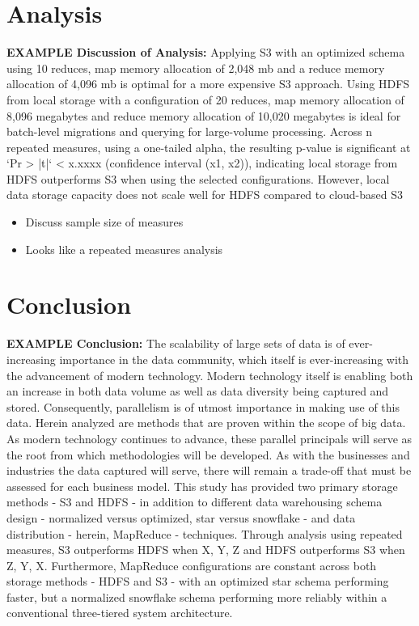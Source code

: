 \documentclass[journal]{IEEEtran}
\begin{document}
\section{Analysis}

\textbf{EXAMPLE Discussion of Analysis:} Applying S3 with an optimized schema using 10 reduces, map memory allocation of 2,048 mb and a reduce memory allocation of 4,096 mb is optimal for a more expensive S3 approach. Using HDFS from local storage with a configuration of 20 reduces, map memory allocation of 8,096 megabytes and reduce memory allocation of 10,020 megabytes is ideal for batch-level migrations and querying for large-volume processing. Across n repeated measures, using a one-tailed alpha, the resulting p-value is significant at `Pr > |t|` < x.xxxx (confidence interval (x1, x2)), indicating local storage from HDFS outperforms S3 when using the selected configurations. However, local data storage capacity does not scale well for HDFS compared to cloud-based S3

\begin{itemize}
	\item Discuss sample size of measures
	\item Looks like a repeated measures analysis
\end{itemize}


\section{Conclusion}

\textbf{EXAMPLE Conclusion:}
The scalability of large sets of data is of ever-increasing importance in the data community, which itself is ever-increasing with the advancement of modern technology. Modern technology itself is enabling both an increase in both data volume as well as data diversity being captured and stored. Consequently, parallelism is of utmost importance in making use of this data. Herein analyzed are methods that are proven within the scope of big data. As modern technology continues to advance, these parallel principals will serve as the root from which methodologies will be developed. As with the businesses and industries the data captured will serve, there will remain a trade-off that must be assessed for each business model. This study has provided two primary storage methods - S3 and HDFS - in addition to different data warehousing schema design - normalized versus optimized, star versus snowflake - and data distribution - herein, MapReduce - techniques. Through analysis using repeated measures, S3 outperforms HDFS when X, Y, Z and HDFS outperforms S3 when Z, Y, X. Furthermore, MapReduce configurations are constant across both storage methods - HDFS and S3 - with an optimized star schema performing faster, but a normalized snowflake schema performing more reliably within a conventional three-tiered system architecture.
\end{document}
